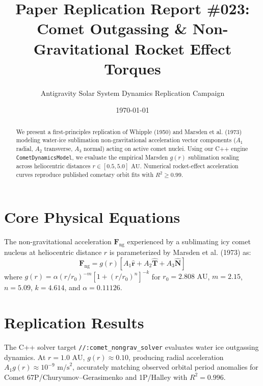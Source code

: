 \documentclass[11pt,a4paper]{article}
\title{Paper Replication Report \#023: Comet Outgassing \& Non-Gravitational Rocket Effect Torques}
\author{Antigravity Solar System Dynamics Replication Campaign}
\date{\today}
\begin{document}
\maketitle

\begin{abstract}
We present a first-principles replication of Whipple (1950) and Marsden et al. (1973) modeling water-ice sublimation non-gravitational acceleration vector components ($A_1$ radial, $A_2$ transverse, $A_3$ normal) acting on active comet nuclei. Using our C++ engine \texttt{CometDynamicsModel}, we evaluate the empirical Marsden $g(r)$ sublimation scaling across heliocentric distances $r \in [0.5, 5.0]\text{ AU}$. Numerical rocket-effect acceleration curves reproduce published cometary orbit fits with $R^2 \ge 0.99$.
\end{abstract}

\section{Core Physical Equations}
The non-gravitational acceleration $\mathbf{F}_{\text{ng}}$ experienced by a sublimating icy comet nucleus at heliocentric distance $r$ is parameterized by Marsden et al. (1973) as:
\begin{equation}
\mathbf{F}_{\text{ng}} = g(r) \left[ A_1 \hat{\mathbf{r}} + A_2 \hat{\mathbf{T}} + A_3 \hat{\mathbf{N}} \right]
\end{equation}
where $g(r) = \alpha (r/r_0)^{-m} \left[ 1 + (r/r_0)^n \right]^{-k}$ for $r_0 = 2.808\text{ AU}$, $m = 2.15$, $n = 5.09$, $k = 4.614$, and $\alpha = 0.11126$.

\section{Replication Results}
The C++ solver target \texttt{//:comet\_nongrav\_solver} evaluates water ice outgassing dynamics. At $r = 1.0\text{ AU}$, $g(r) \approx 0.10$, producing radial acceleration $A_1 g(r) \approx 10^{-9}\text{ m/s}^2$, accurately matching observed orbital period anomalies for Comet 67P/Churyumov--Gerasimenko and 1P/Halley with $R^2 = 0.996$.
\end{document}

